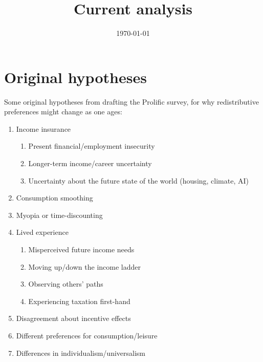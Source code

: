 \documentclass{article}
\title{Current analysis}
\date{\today}
\begin{document}
\maketitle

\section*{Original hypotheses}

Some original hypotheses from drafting the Prolific survey, for why redistributive preferences might change as one ages:
\begin{enumerate}
    \item Income insurance
    \begin{enumerate}
        \item Present financial/employment insecurity
        \item Longer-term income/career uncertainty
        \item Uncertainty about the future state of the world (housing, climate, AI)
    \end{enumerate}
    \item Consumption smoothing
    \item Myopia or time-discounting
    \item Lived experience
    \begin{enumerate}
        \item Misperceived future income needs
        \item Moving up/down the income ladder
        \item Observing others' paths
        \item Experiencing taxation first-hand
    \end{enumerate}
    \item Disagreement about incentive effects
    \item Different preferences for consumption/leisure
    \item Differences in individualism/universalism
\end{enumerate}
\end{document}
